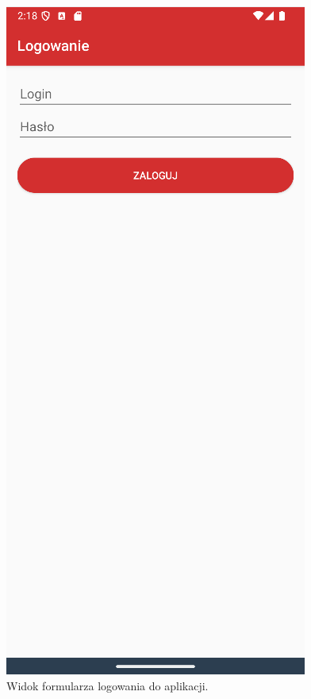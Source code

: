 \begin{figure}[H]
    \centering
    \includegraphics[scale=0.5]{img/imp/widok-log.png}
    \caption{Widok formularza logowania do aplikacji.}
    \label{widok:login}
\end{figure}

